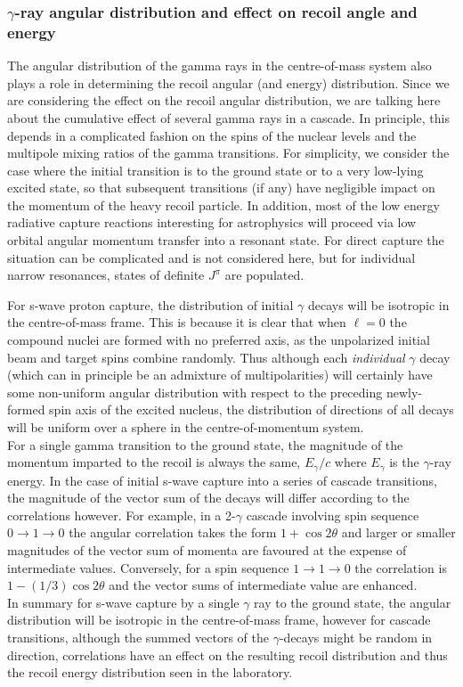 \subsubsection{$\gamma$-ray angular distribution and effect on recoil angle and energy} 

The angular distribution of the gamma rays in the centre-of-mass system also plays a role in determining the recoil angular (and energy) distribution. Since we are considering the effect on the recoil angular distribution, we are talking here about the cumulative effect of several gamma rays in a cascade. In principle, this depends in a complicated fashion on the spins of the nuclear levels and the multipole mixing ratios of the gamma transitions. For simplicity, we consider the case where the initial transition is to the ground state or to a very low-lying excited state, so that subsequent transitions (if any) have negligible impact on the momentum of the heavy recoil particle. In addition, most of the low energy radiative capture reactions interesting for astrophysics will proceed via low orbital angular momentum transfer into a resonant state. For direct capture the situation can be complicated and is not considered here, but for individual narrow resonances, states of definite $J^{\pi}$ are populated.

For s-wave proton capture, the distribution of initial $\gamma$ decays will be isotropic in the centre-of-mass frame. This is because it is clear that when $\ell=0$ the compound nuclei are formed with no preferred axis, as the unpolarized initial beam and target spins combine randomly. Thus although each {\em individual} $\gamma$ decay (which can in principle be an admixture of multipolarities) will certainly have some non-uniform angular distribution with respect to the preceding newly-formed spin axis of the excited nucleus, the distribution of directions of all decays will be uniform over a sphere in the centre-of-momentum system. \\
For a single gamma transition to the ground state, the magnitude of the momentum imparted to the recoil is always the same, $E_{\gamma}/c$ where $E_{\gamma}$ is the $\gamma$-ray energy.
In the case of initial s-wave capture into a series of cascade transitions, the magnitude of the vector sum of the decays will differ according to the correlations however.
For example, in a 2-$\gamma$ cascade involving spin sequence $0\rightarrow 1 \rightarrow 0$  the angular correlation takes the form $1+\cos{2\theta}$ and larger or smaller magnitudes of the vector sum of momenta are favoured at the expense of intermediate values.  Conversely, for a spin sequence $1\rightarrow 1 \rightarrow 0$ the correlation is $1-(1/3)\cos{2\theta}$ and the vector sums of intermediate value are enhanced. \\
In summary for s-wave capture by a single $\gamma$ ray to the ground state, the angular distribution will be  isotropic in the centre-of-mass frame, however for cascade transitions, although the summed vectors of the $\gamma$-decays might be random in direction, correlations have an effect on the resulting recoil distribution and thus the recoil energy distribution seen in the laboratory. 

